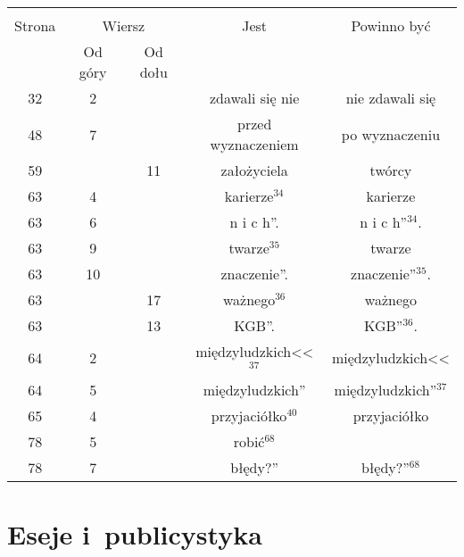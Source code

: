 \documentclass[a4paper,11pt]{article}
\begin{document}
\begin{center}
  \begin{tabular}{|c|c|c|c|c|}
    \hline
    & \multicolumn{2}{c|}{} & & \\
    Strona & \multicolumn{2}{c|}{Wiersz} & Jest
                              & Powinno być \\ \cline{2-3}
    & Od góry & Od dołu & & \\
    \hline
    32 &  2 & & zdawali się nie & nie zdawali się \\
    48 &  7 & & przed wyznaczeniem & po wyznaczeniu \\
    59 & & 11 & założyciela & twórcy \\
    63 &  4 & & karierze$^{ 34 }$ & karierze \\
    63 &  6 & & n i c h''. & n i c h''$^{ 34 }$. \\
    63 &  9 & & twarze$^{ 35 }$ & twarze \\
    63 & 10 & & znaczenie''. & znaczenie''$^{ 35 }$. \\
    63 & & 17 & ważnego$^{ 36 }$ & ważnego \\
    63 & & 13 & KGB''. & KGB''$^{ 36 }$. \\
    64 &  2 & & międzyludzkich<<$^{ 37 }$ & międzyludzkich<< \\
    64 &  5 & & międzyludzkich'' & międzyludzkich''$^{ 37 }$ \\
    65 &  4 & & przyjaciółko$^{ 40 }$ & przyjaciółko \\
    78 &  5 & & robić$^{ 68 }$ & \\
    78 &  7 & & błędy?'' & błędy?''$^{ 68 }$ \\
    \hline
  \end{tabular}
\end{center}

\vspace{\spaceTwo}





\section{Eseje i~publicystyka}

\vspace{\spaceTwo}
\end{document}
